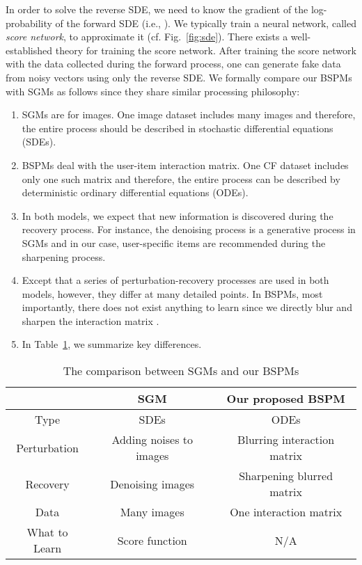 \documentclass[sigconf,natbib=true]{acmart}
\begin{document}
In order to solve the reverse SDE, we need to know the gradient of the log-probability of the forward SDE (i.e., ). We typically train a neural network, called \emph{score network}, to approximate it (cf. Fig.~\ref{fig:sde}). There exists a well-established theory for training the score network. After training the score network with the data collected during the forward process, one can generate fake data from noisy vectors using only the reverse SDE. We formally compare our BSPMs with SGMs as follows since they share similar processing philosophy:
\begin{enumerate}
    \item SGMs are for images. One image dataset includes many images and therefore, the entire process should be described in stochastic differential equations (SDEs).
    \item BSPMs deal with the user-item interaction matrix. One CF dataset includes only one such matrix and therefore, the entire process can be described by deterministic ordinary differential equations (ODEs).
    \item In both models, we expect that new information is discovered during the recovery process. For instance, the denoising process is a generative process in SGMs and in our case, user-specific items are recommended during the sharpening process.
    \item Except that a series of perturbation-recovery processes are used in both models, however, they differ at many detailed points. In BSPMs, most importantly, there does not exist anything to learn since we directly blur and sharpen the interaction matrix .
    \item In Table~\ref{tbl:cmp}, we summarize key differences.
\end{enumerate}
\begin{table}[t]
    \small
    \setlength{\tabcolsep}{2pt}
    \caption{The comparison between SGMs and our BSPMs\label{tbl:cmp}}
    \begin{tabular}{ccc}\toprule
         & SGM & Our proposed BSPM \\ \midrule
        Type & SDEs & ODEs \\ 
        Perturbation & Adding noises to images & Blurring interaction matrix \\
        Recovery & Denoising images & Sharpening blurred matrix \\ 
        Data & Many images  & One interaction matrix \\
        What to Learn & Score function & N/A \\         \bottomrule
    \end{tabular}
\end{table}
\end{document}
